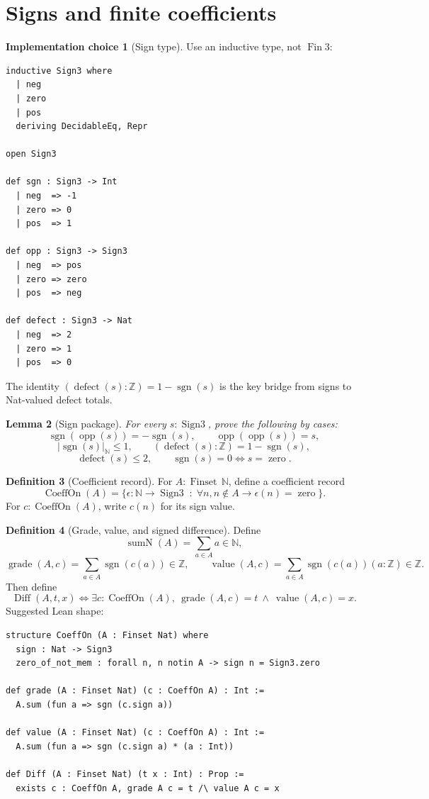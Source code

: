 \documentclass[11pt]{article}
\theoremstyle{definition}
\newtheorem{definition}{Definition}[section]
\newtheorem{implementation}[definition]{Implementation choice}
\theoremstyle{plain}
\newtheorem{lemma}[definition]{Lemma}
\theoremstyle{remark}
\newcommand{\N}{\mathbb{N}}
\newcommand{\Z}{\mathbb{Z}}
\newcommand{\Finset}{\operatorname{Finset}}
\newcommand{\Sgn}{\operatorname{Sign3}}
\newcommand{\sgn}{\operatorname{sgn}}
\newcommand{\opp}{\operatorname{opp}}
\newcommand{\defect}{\operatorname{defect}}
\newcommand{\nabs}[1]{\left|#1\right|_{\N}}
\newcommand{\SumN}{\operatorname{sumN}}
\newcommand{\CoeffOn}{\operatorname{CoeffOn}}
\newcommand{\Grade}{\operatorname{grade}}
\newcommand{\Val}{\operatorname{value}}
\newcommand{\Diff}{\operatorname{Diff}}
\begin{document}
\section{Signs and finite coefficients}

\begin{implementation}[Sign type]
Use an inductive type, not \(\operatorname{Fin} 3\):
\begin{verbatim}
inductive Sign3 where
  | neg
  | zero
  | pos
  deriving DecidableEq, Repr

open Sign3

def sgn : Sign3 -> Int
  | neg  => -1
  | zero => 0
  | pos  => 1

def opp : Sign3 -> Sign3
  | neg  => pos
  | zero => zero
  | pos  => neg

def defect : Sign3 -> Nat
  | neg  => 2
  | zero => 1
  | pos  => 0
\end{verbatim}
The identity \((\defect(s):\Z)=1-\sgn(s)\) is the key bridge from signs to Nat-valued defect totals.
\end{implementation}

\begin{lemma}[Sign package]\label{lem:v9-sign-package}
For every \(s:\Sgn\), prove the following by cases:
\[
        \sgn(\opp(s))=-\sgn(s),
        \qquad \opp(\opp(s))=s,
\]
\[
        \nabs{\sgn(s)}\le1,
        \qquad (\defect(s):\Z)=1-\sgn(s),
\]
\[
        \defect(s)\le2,
        \qquad \sgn(s)=0\Longleftrightarrow s=\operatorname{zero}.
\]
\end{lemma}

\begin{definition}[Coefficient record]\label{def:v9-coeffon}
For \(A:\Finset\,\N\), define a coefficient record
\[
\CoeffOn(A)=\{\epsilon:\N\to\Sgn\;:\; \forall n, n\notin A\to \epsilon(n)=\operatorname{zero}\}.
\]
For \(c:\CoeffOn(A)\), write \(c(n)\) for its sign value.
\end{definition}

\begin{definition}[Grade, value, and signed difference]\label{def:v9-grade-value-diff}
Define
\[
        \SumN(A)=\sum_{a\in A}a\in\N,
\]
\[
        \Grade(A,c)=\sum_{a\in A}\sgn(c(a))\in\Z,
        \qquad
        \Val(A,c)=\sum_{a\in A}\sgn(c(a))(a:\Z)\in\Z.
\]
Then define
\[
        \Diff(A,t,x)\Longleftrightarrow
        \exists c:\CoeffOn(A),\ \Grade(A,c)=t\ \wedge\ \Val(A,c)=x.
\]
Suggested Lean shape:
\begin{verbatim}
structure CoeffOn (A : Finset Nat) where
  sign : Nat -> Sign3
  zero_of_not_mem : forall n, n notin A -> sign n = Sign3.zero

def grade (A : Finset Nat) (c : CoeffOn A) : Int :=
  A.sum (fun a => sgn (c.sign a))

def value (A : Finset Nat) (c : CoeffOn A) : Int :=
  A.sum (fun a => sgn (c.sign a) * (a : Int))

def Diff (A : Finset Nat) (t x : Int) : Prop :=
  exists c : CoeffOn A, grade A c = t /\ value A c = x
\end{verbatim}
\end{definition}
\end{document}
